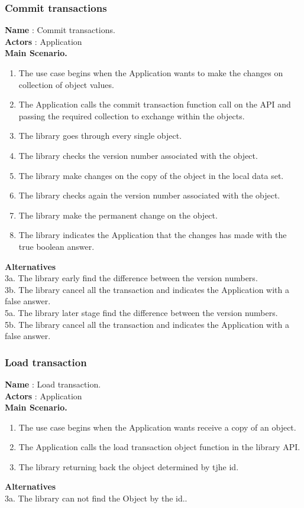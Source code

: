 \documentclass[12pt]{article}
\begin{document}
{\subsubsection{Commit transactions}
\textbf{Name} : Commit transactions.\\
\textbf{Actors} : Application\\
\textbf{Main Scenario.}
\begin{enumerate}
  \item The use case begins when the Application wants to make the changes on collection of object values.
  \item The Application calls the commit transaction function call on the API and passing the required collection to exchange within the objects.
  \item The library goes through every single object.
  \item The library checks the version number associated with the object.
  \item The library make changes on the copy of the object in the local data set.
  \item The library checks again the version number associated with the object. 
  \item The library make the permanent change on the object.
  \item The library indicates the Application that the changes has made with the true boolean answer.
\end{enumerate}
\textbf{Alternatives}\\
3a. The library early find the difference between the version numbers.\\
3b. The library cancel all the transaction and indicates the Application with a false answer.\\
5a. The library later stage find the difference between the version numbers.\\
5b. The library cancel all the transaction and indicates the Application with a false answer.\\
\subsubsection{Load transaction}
\textbf{Name} : Load transaction.\\
\textbf{Actors} : Application\\
\textbf{Main Scenario.}
\begin{enumerate}
  \item The use case begins when the Application wants receive a copy of an object.
  \item The Application calls the load transaction object function in the library API. 
  \item The library returning back the object determined by tjhe id. 
\end{enumerate}
\textbf{Alternatives}\\
3a. The library can not find the Object by the id..\\

}
\end{document}

